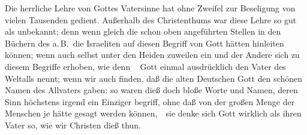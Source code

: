Die herrliche Lehre von Gottes Vatersinne hat ohne Zweifel zur Beseligung von vielen Tausenden gedient. Außerhalb des Christenthums war diese Lehre so gut als unbekannt; denn wenn gleich die schon oben angeführten Stellen in den Büchern des a.\,B.\ die Israeliten auf diesen Begriff von Gott hätten hinleiten können; wenn auch selbst unter den Heiden zuweilen ein und der Andere sich zu diesem Begriffe erhoben, wie denn \zB\  Gott einmal ausdrücklich den Vater des Weltalls nennt; wenn wir auch finden, daß die alten Deutschen Gott den schönen Namen des Allvaters gaben: so waren dieß doch bloße Worte und Namen, deren Sinn höchstens irgend ein Einziger begriff, ohne daß von der großen Menge der Menschen je hätte gesagt werden können,~\ sie denke sich Gott wirklich als ihren Vater so, wie wir Christen dieß thun.

